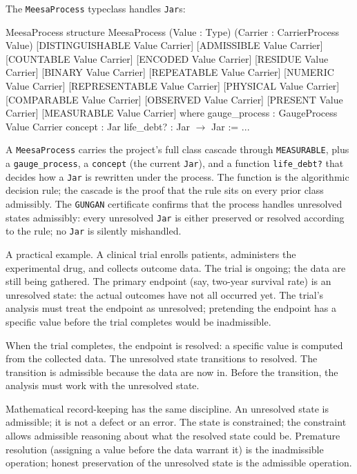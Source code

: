 The \texttt{MeesaProcess} typeclass handles \texttt{Jar}s:

\begin{leanexcerpt}{MeesaProcess}
structure MeesaProcess
    (Value : Type)
    (Carrier : CarrierProcess Value)
    [DISTINGUISHABLE Value Carrier]
    [ADMISSIBLE Value Carrier]
    [COUNTABLE Value Carrier]
    [ENCODED Value Carrier]
    [RESIDUE Value Carrier]
    [BINARY Value Carrier]
    [REPEATABLE Value Carrier]
    [NUMERIC Value Carrier]
    [REPRESENTABLE Value Carrier]
    [PHYSICAL Value Carrier]
    [COMPARABLE Value Carrier]
    [OBSERVED Value Carrier]
    [PRESENT Value Carrier]
    [MEASURABLE Value Carrier]
  where
  gauge_process : GaugeProcess Value Carrier
  concept       : Jar
  life_debt?    : Jar $\to$ Jar := ...
\end{leanexcerpt}

A \texttt{MeesaProcess} carries the project's full class cascade
through \texttt{MEASURABLE}, plus a \texttt{gauge\_process}, a
\texttt{concept} (the current \texttt{Jar}), and a function
\texttt{life\_debt?} that decides how a \texttt{Jar} is rewritten
under the process. The function is the algorithmic decision rule;
the cascade is the proof that the rule sits on every prior class
admissibly. The \texttt{GUNGAN} certificate confirms that the
process handles unresolved states admissibly: every unresolved
\texttt{Jar} is
either preserved or resolved according to the rule; no
\texttt{Jar} is silently mishandled.

A practical example. A clinical trial enrolls patients, administers
the experimental drug, and collects outcome data. The trial is
ongoing; the data are still being gathered. The primary endpoint
(say, two-year survival rate) is an unresolved state: the actual
outcomes have not all occurred yet. The trial's analysis must
treat the endpoint as unresolved; pretending the endpoint has a
specific value before the trial completes would be inadmissible.

When the trial completes, the endpoint is resolved: a specific
value is computed from the collected data. The unresolved state
transitions to resolved. The transition is admissible because
the data are now in. Before the transition, the analysis must
work with the unresolved state.

Mathematical record-keeping has the same discipline. An unresolved
state is admissible; it is not a defect or an error. The state is
constrained; the constraint allows admissible reasoning about
what the resolved state could be. Premature resolution
(assigning a value before the data warrant it) is the
inadmissible operation; honest preservation of the unresolved
state is the admissible operation.

